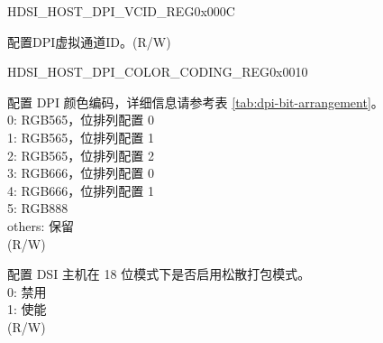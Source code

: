     
    \begin{register}{H}{DSI\_HOST\_DPI\_VCID\_REG}{0x000C}\label{regdesc:DSIHOSTDPIVCIDREG}
    \regnewline%
    \begin{regdesc}\begin{reglist}
    \label{fielddesc:DSIHOSTDPIVCID}\item [DSI\_HOST\_DPI\_VCID] 配置DPI虚拟通道ID。(R/W)
    \end{reglist}\end{regdesc}
    \end{register}
    
    
    \begin{register}{H}{DSI\_HOST\_DPI\_COLOR\_CODING\_REG}{0x0010}\label{regdesc:DSIHOSTDPICOLORCODINGREG}
    \regnewline%
    \begin{regdesc}\begin{reglist}
    \label{fielddesc:DSIHOSTDPICOLORCODING}\item [DSI\_HOST\_DPI\_COLOR\_CODING] 配置 DPI 颜色编码，详细信息请参考表 \ref{tab:dpi-bit-arrangement}。\\

    0: RGB565，位排列配置 0\\
    1: RGB565，位排列配置 1\\
    2: RGB565，位排列配置 2\\
    3: RGB666，位排列配置 0\\
    4: RGB666，位排列配置 1\\
    5: RGB888\\
    others: 保留\\(R/W)

    \label{fielddesc:DSIHOSTLOOSELY18EN}\item [DSI\_HOST\_LOOSELY18\_EN] 配置 DSI 主机在 18 位模式下是否启用松散打包模式。\\0: 禁用\\1: 使能 \\(R/W)
    \end{reglist}\end{regdesc}
    \end{register}
    
